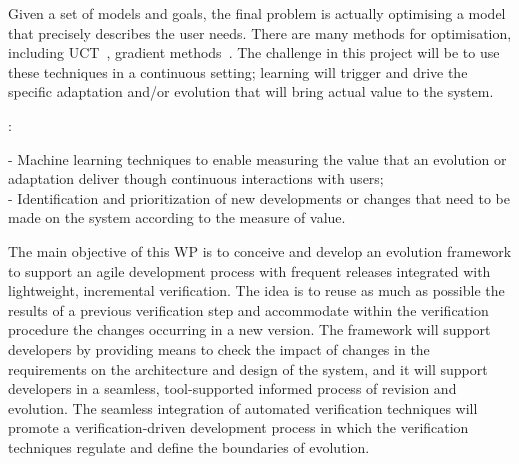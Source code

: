 \documentclass[12pt]{article}
\begin{document}
Given a set
of models and goals, the final problem is actually optimising a model that precisely describes the user needs. There are many
methods for optimisation, including
UCT~\cite{ECML:Kocsis+Szepesvari:2006}, gradient
methods~\cite{dimitrakakis:gbrl,ghavamzadeh:bpga,knowgrad}. The challenge in this project will be to use these techniques in a continuous setting; learning will trigger and drive the specific adaptation and/or evolution that will bring actual value to the system.

:
 
 - Machine learning techniques to enable measuring the value that an evolution or adaptation deliver though continuous interactions with users;\\ 
 - Identification and prioritization of new developments or changes that need to be made on the system according to the measure of value. 

\vspace{.2cm}

\noindent The main objective of this WP is to conceive and develop an evolution framework to support an agile development process with frequent releases integrated with lightweight, incremental verification.  The idea is to reuse as much as possible the results of a previous verification step and accommodate within the verification procedure the changes  occurring in a new version.
The framework will support developers by providing means to check the impact of changes in the requirements on the architecture and design of the system, and it will support developers in a seamless, tool-supported informed process of revision and evolution.
The seamless integration of automated verification techniques will promote a verification-driven development process in which the verification techniques regulate and define the boundaries of evolution. 
\end{document}
